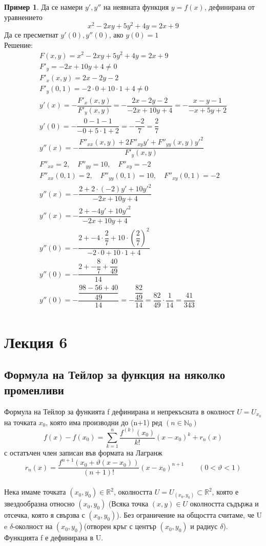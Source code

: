 \documentclass[a4paper,fleqn,12pt]{article}
\theoremstyle{definition}
\newtheorem{example}{Пример}[subsection]
\begin{document}
\begin{example}
Да се намери $y', y''$ на неявната функция $y = f(x)$, дефинирана от уравнението 
$$x^2 - 2xy + 5y^2 + 4y = 2x + 9$$
Да се пресметнат $y'(0), y''(0)$, ако $y(0) = 1$ \\
Решение: 
\begin{gather*}
F(x,y) = x^2 - 2xy + 5y^2 + 4y = 2x + 9\\
F'_y = -2x + 10y + 4 \neq 0\\
F'_x(x,y) = 2x - 2y - 2\\
F'_y(0,1) = -2 \cdot 0 + 10 \cdot 1 + 4 \neq 0\\
y'(x) = - \dfrac{F'_x(x,y)}{F'_y(x,y)} = - \dfrac{2x - 2y - 2}{-2x + 10y + 4} = - \dfrac{x - y - 1}{- x + 5y + 2}\\
y'(0) = - \dfrac{0 - 1 - 1}{- 0 + 5 \cdot 1 + 2} = - \dfrac{-2}{7} = \dfrac{2}{7}\\
y''(x) = - \dfrac{F''_{xx}(x,y) + 2F''_{xy}y' + F''_{yy}(x,y)y'^2}{F'_y(x,y)}\\
F''_{xx} = 2, \quad F''_{yy} = 10, \quad F''_{xy} = -2\\
F''_{xx}(0,1) = 2, \quad F''_{yy}(0,1) = 10, \quad F''_{xy}(0,1) = -2\\
y''(x) = - \dfrac{2 + 2 \cdot (-2)y' + 10y'^2}{-2x + 10y + 4}\\
y''(x) = - \dfrac{2 + - 4y' + 10y'^2}{-2x + 10y + 4}\\
y''(0) = - \dfrac{2 + - 4 \cdot \dfrac{2}{7} + 10 \cdot \left( \dfrac{2}{7} \right) ^2}{-2 \cdot 0 + 10 \cdot 1 + 4}\\
y''(0) = - \dfrac{2 + - \dfrac{8}{7} + \dfrac{40}{49}}{14}\\
y''(0) = - \dfrac{\dfrac{98 - 56 + 40}{49}}{14} = - \dfrac{\dfrac{82}{49}}{14} = \dfrac{82}{49} \cdot \dfrac{1}{14} = \dfrac{41}{343}\\
\end{gather*}
\end{example}

\newpage

\section{Лекция 6}

\subsection{Формула на Тейлор за функция на няколко променливи}
Формула на Тейлор за функията f дефинирана и непрекъсната в околност $U = U_{x_0}$ на точката $x_0$, която има производни до (n+1) ред $(n \in \mathbb{N}_0)$
$$f(x) - f(x_0) = \sum_{k=1} ^n \dfrac{f^{(k)}(x_0)}{k!} (x - x_0)^k  + r_n(x)$$
с остатъчен член записан във формата на Лагранж
$$r_n(x) = \dfrac{f^{n+1}(x_0 + \vartheta(x - x_0))}{(n+1)!} (x - x_0)^{n+1} \qquad (0 < \vartheta < 1)$$
\\
Нека имаме точката $(x_0,y_0) \in \mathbb{R}^2$, околността $U = U_{(x_0,y_0)} \subset \mathbb{R}^2$, която е звездообразна относно $(x_0,y_0)$ (Всяка точка $(x,y) \in U$ околността съдържа и отсечка, която я свързва с $(x_0,y_0)$). Без ограничение на общостта считаме, че U e $\delta$-околност на $(x_0,y_0)$(отворен кръг с център $(x_0,y_0)$ и радиус $\delta$). Функцията f е дефинирана в U.
\end{document}
